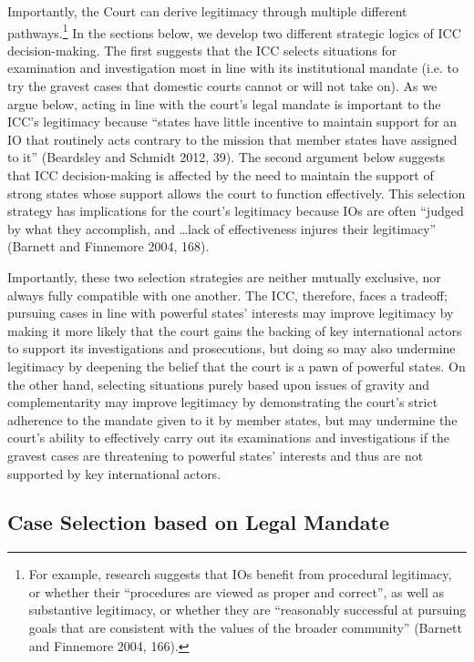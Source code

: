 Importantly, the Court can derive legitimacy through multiple different pathways.\footnote{For example, research suggests that IOs benefit from procedural legitimacy, or whether their ``procedures are viewed as proper and correct'', as well as substantive legitimacy, or whether they are ``reasonably successful at pursuing goals that are consistent with the values of the broader community'' (Barnett and Finnemore 2004, 166).} In the sections below, we develop two different strategic logics of ICC decision-making.  The first suggests that the ICC selects situations for examination and investigation most in line with its institutional mandate (i.e. to try the gravest cases that domestic courts cannot or will not take on).  As we argue below, acting in line with the court's legal mandate is important to the ICC's legitimacy because “states have little incentive to maintain support for an IO that routinely acts contrary to the mission that member states have assigned to it” (Beardsley and Schmidt 2012, 39).  The second argument below suggests that ICC decision-making is affected by the need to maintain the support of strong states whose support allows the court to function effectively.  This selection strategy has implications for the court's legitimacy because IOs are often ``judged by what they accomplish, and \ldots lack of effectiveness injures their legitimacy'' (Barnett and Finnemore 2004, 168).  

Importantly, these two selection strategies are neither mutually exclusive, nor always fully compatible with one another.  The ICC, therefore, faces a tradeoff; pursuing cases in line with powerful states' interests may improve legitimacy by making it more likely that the court gains the backing of key international actors to support its investigations and prosecutions, but doing so may also undermine legitimacy by deepening the belief that the court is a pawn of powerful states.  On the other hand, selecting situations purely based upon issues of gravity and complementarity may improve legitimacy by demonstrating the court's strict adherence to the mandate given to it by member states, but may undermine the court's ability to effectively carry out its examinations and investigations if the gravest cases are threatening to powerful states' interests and thus are not supported by key international actors.

\subsection*{Case Selection based on Legal Mandate}

